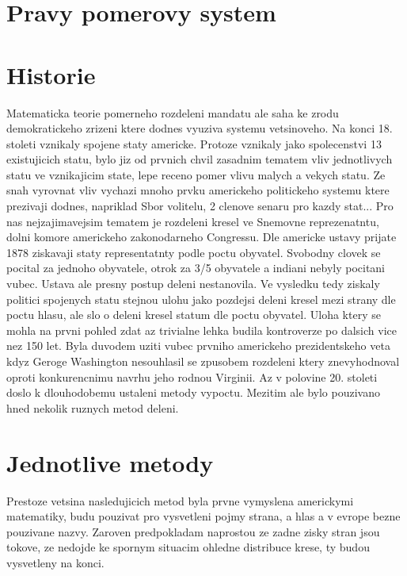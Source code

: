 \documentclass[12pt,a4paper]{article}
\begin{document}
\section{Pravy pomerovy system} %

\section{Historie}
Matematicka teorie pomerneho rozdeleni mandatu ale saha ke zrodu demokratickeho zrizeni ktere dodnes vyuziva systemu vetsinoveho.
Na konci 18.
stoleti vznikaly spojene staty americke.\autocite{BAL2}
Protoze vznikaly jako spolecenstvi 13 existujicich statu, bylo jiz od prvnich chvil zasadnim tematem vliv jednotlivych statu ve vznikajicim state, lepe receno pomer vlivu malych a vekych statu.
Ze snah vyrovnat vliv vychazi mnoho prvku americkeho politickeho systemu ktere prezivaji dodnes, napriklad Sbor volitelu, 2 clenove senaru pro kazdy stat... 
Pro nas nejzajimavejsim tematem je rozdeleni kresel ve Snemovne reprezenatntu, dolni komore americkeho zakonodarneho Congressu.
Dle americke ustavy prijate 1878 ziskavaji staty representatnty podle poctu obyvatel.
Svobodny clovek se pocital za jednoho obyvatele, otrok za 3/5 obyvatele a indiani nebyly pocitani vubec.
Ustava ale presny postup deleni nestanovila.
Ve vysledku tedy ziskaly politici spojenych statu stejnou ulohu jako pozdejsi deleni kresel mezi strany dle poctu hlasu, ale slo o deleni kresel statum dle poctu obyvatel. 
Uloha ktery se mohla na prvni pohled zdat az trivialne lehka budila kontroverze po dalsich vice nez 150 let.
Byla duvodem uziti vubec prvniho americkeho prezidentskeho veta kdyz Geroge Washington nesouhlasil se zpusobem rozdeleni ktery znevyhodnoval oproti konkurencnimu navrhu jeho rodnou Virginii.
Az v polovine 20. stoleti doslo k dlouhodobemu ustaleni metody vypoctu.
Mezitim ale bylo pouzivano hned nekolik ruznych metod deleni. %

\section{Jednotlive metody}
Prestoze vetsina nasledujicich metod byla prvne vymyslena americkymi matematiky, budu pouzivat pro vysvetleni pojmy strana, a hlas a v evrope bezne pouzivane nazvy.
Zaroven predpokladam naprostou ze zadne zisky stran jsou tokove, ze nedojde ke spornym situacim ohledne distribuce krese, ty budou vysvetleny na konci. 
\end{document}
